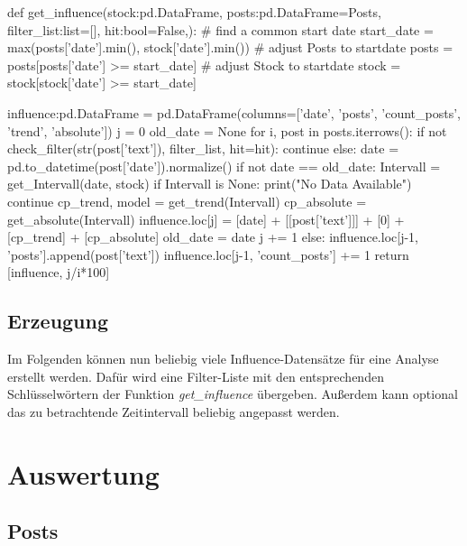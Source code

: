 \documentclass{article}
\begin{document}
\begin{python}
def get_influence(stock:pd.DataFrame, posts:pd.DataFrame=Posts, filter_list:list=[], hit:bool=False,):
    # find a common start date
    start_date = max(posts['date'].min(), stock['date'].min())
    # adjust Posts to startdate
    posts = posts[posts['date'] >= start_date]
    # adjust Stock to startdate
    stock = stock[stock['date'] >= start_date]

    influence:pd.DataFrame = pd.DataFrame(columns=['date', 'posts', 'count_posts', 'trend', 'absolute'])
    j = 0
    old_date = None
    for i, post in posts.iterrows():
        if not check_filter(str(post['text']), filter_list, hit=hit):
            continue
        else:
            date = pd.to_datetime(post['date']).normalize()
            if not date == old_date:
                Intervall = get_Intervall(date, stock)
                if Intervall is None:
                    print("No Data Available")
                    continue
                cp_trend, model = get_trend(Intervall)
                cp_absolute = get_absolute(Intervall)
                influence.loc[j] = [date] + [[post['text']]] + [0] + [cp_trend] + [cp_absolute]
                old_date = date
                j += 1
            else:
                influence.loc[j-1, 'posts'].append(post['text'])
                influence.loc[j-1, 'count_posts'] += 1
    return [influence, j/i*100]
\end{python}



\subsection{Erzeugung} \label{Erzeugung}
Im Folgenden können nun beliebig viele Influence-Datensätze für eine Analyse erstellt werden.
Dafür wird eine Filter-Liste mit den entsprechenden Schlüsselwörtern der Funktion \textit{get\_influence} übergeben.
Außerdem kann optional das zu betrachtende Zeitintervall beliebig angepasst werden.


\newpage

\section{Auswertung} \label{Auswertung}

\subsection{Posts} \label{Posts}
\end{document}
